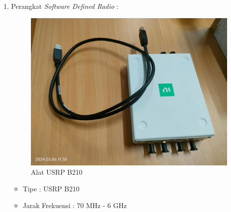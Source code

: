 \begin{enumerate}
	\item Perangkat \textit{Software Defined Radio} :
	\begin{figure}
		\begin{center}
			\includegraphics[scale=0.045]{pics/bab3/usrp2.jpg}
			\caption{Alat USRP B210}
			\label{img:logPeriodic}
		\end{center}
	\end{figure}
	\begin{itemize}
		\item Tipe : USRP B210 
		\item Jarak Frekuensi : 70 MHz - 6 GHz 
	\end{itemize}


\end{enumerate}
